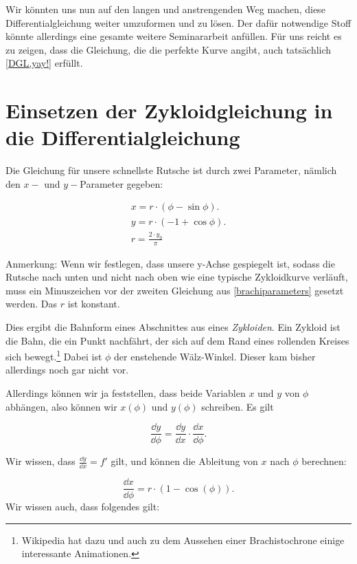 Wir könnten uns nun auf den langen und anstrengenden Weg machen, diese Differentialgleichung weiter umzuformen und zu lösen. 
Der dafür notwendige Stoff könnte allerdings eine gesamte weitere Seminararbeit anfüllen. 
Für uns reicht es zu zeigen, dass die Gleichung, die die perfekte Kurve angibt, auch tatsächlich \ref{DGL,yay!} erfüllt.


\section{Einsetzen der Zykloidgleichung in die Differentialgleichung}


Die Gleichung für unsere schnellste Rutsche ist durch zwei Parameter, nämlich den $x-$ und $y-$Parameter gegeben:

\begin{equation}\label{brachiparameters}
 \begin{gathered}
  x= r \cdot (\phi - \sin \phi ).\\
  y = r \cdot (-1+ \cos \phi ). \\
  r=\frac{2 \cdot y_0}{\pi}
 \end{gathered}
\end{equation}

Anmerkung: Wenn wir festlegen, dass unsere y-Achse gespiegelt ist, sodass die Rutsche nach unten und nicht nach oben wie eine typische Zykloidkurve verläuft, muss ein Minuszeichen vor der zweiten Gleichung aus \ref{brachiparameters} gesetzt werden. Das $r$ ist konstant.

Dies ergibt die Bahnform eines Abschnittes aus eines \textit{Zykloiden}. 
Ein Zykloid ist die Bahn, die ein Punkt nachfährt, der sich auf dem Rand eines rollenden Kreises sich bewegt.\footnote{Wikipedia hat dazu und auch zu dem Aussehen einer Brachistochrone einige interessante Animationen.}
Dabei ist $\phi$ der enstehende Wälz-Winkel. 
Dieser kam bisher allerdings noch gar nicht vor.

Allerdings können wir ja feststellen, dass beide Variablen $x$ und $y$ von $\phi$ abhängen, also können wir $x(\phi)$ und $y(\phi)$ schreiben.
Es gilt

\begin{equation}
 \frac{\dd y}{\dd \phi} = \frac{\dd y}{\dd x} \cdot \frac{\dd x}{\dd \phi}.
\end{equation}

Wir wissen, dass $\frac{\dd y}{\dd x}=f'$ gilt, und können die Ableitung von $x$ nach $\phi$ berechnen:

\begin{equation}
 \frac{\dd x}{\dd \phi} = r \cdot (1- \cos (\phi)).
\end{equation}
Wir wissen auch, dass folgendes gilt:

